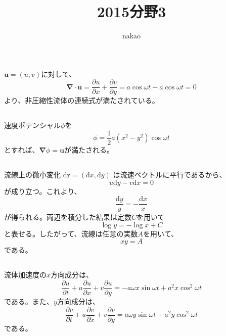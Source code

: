 \documentclass[a4paper]{jsarticle}
\begin{document}
\title{2015分野3}
\author{nakao}
\maketitle

\section{}
\subsection{}
$\boldsymbol{u} = (u, v)$に対して、
\begin{equation}
  \boldsymbol{\nabla} \cdot \boldsymbol{u} = 
  \frac{\partial u}{\partial x} + \frac{\partial v}{\partial y} =
  a \cos \omega t - a \cos \omega t = 0
\end{equation}
より、非圧縮性流体の連続式が満たされている。

\subsection{}
速度ポテンシャル$\phi$を
\begin{equation}
  \phi = \frac{1}{2} a (x^2 - y^2) \cos \omega t
\end{equation}
とすれば、$\boldsymbol{\nabla} \phi = \boldsymbol{u}$が満たされる。

\subsection{}
流線上の微小変化
$\mathrm{d} \boldsymbol{r} = (\mathrm{d} x, \mathrm{d} y)$
は流速ベクトルに平行であるから、
\begin{equation}
  u \mathrm{d} y - v \mathrm{d} x = 0
\end{equation} 
が成り立つ。これより、
\begin{equation}
  \frac{\mathrm{d} y}{y} = -\frac{\mathrm{d} x}{x}
\end{equation}
が得られる。両辺を積分した結果は定数$C$を用いて
\begin{equation}
  \log y = -\log x + C
\end{equation}
と表せる。したがって、流線は任意の実数$A$を用いて、
\begin{equation}
  xy = A
\end{equation}
である。

\subsection{}
流体加速度の$x$方向成分は、
\begin{equation}
  \frac{\partial u}{\partial t} +
  u \frac{\partial u}{\partial x} +
  v \frac{\partial u}{\partial y} =
  -a \omega x \sin \omega t + a^2 x \cos^2 \omega t
\end{equation}
である。また、$y$方向成分は、
\begin{equation}
  \frac{\partial v}{\partial t} +
  u \frac{\partial v}{\partial x} +
  v \frac{\partial v}{\partial y} =
  a \omega y \sin \omega t + a^2 y \cos^2 \omega t
\end{equation}
である。
\end{document}
